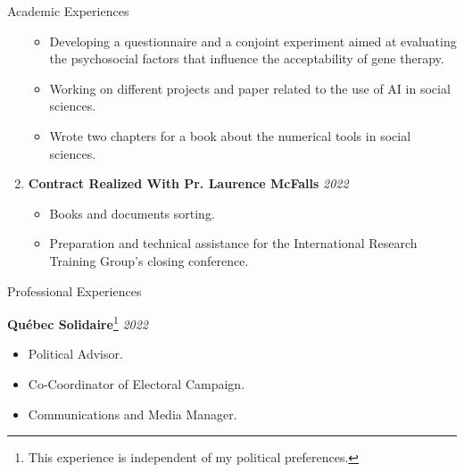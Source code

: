 \documentclass{resume} %
\begin{document}
\begin{rSection}{Academic Experiences}
\begin{enumerate}
\begin{itemize}
            \item Developing a questionnaire and a conjoint experiment aimed at evaluating the psychosocial factors that influence the acceptability of gene therapy.
            \item Working on different projects and paper related to the use of AI in social sciences.
            \item Wrote two chapters for a book about the numerical tools in social sciences.
        \end{itemize}
    \item \textbf{Contract Realized With Pr. Laurence McFalls} \hfill {\em 2022}
        \begin{itemize}
            \item Books and documents sorting.
            \item Preparation and technical assistance for the International Research Training Group's closing conference.
        \end{itemize}
\end{enumerate}

\end{rSection}

\begin{rSection}{Professional Experiences}

{\bf Québec Solidaire}\footnote{This experience is independent of my political preferences.}  \hfill {\em 2022}
\begin{itemize}
    \item Political Advisor.
    \item Co-Coordinator of Electoral Campaign.
    \item Communications and Media Manager.
\end{itemize}

\end{rSection}

\end{document}

